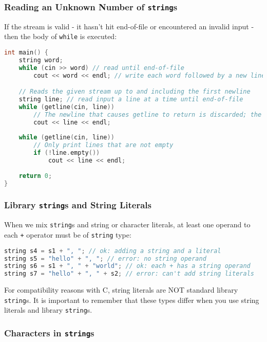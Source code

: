 \subsubsection{Reading an Unknown Number of \texttt{string}s}

If the stream is valid - it hasn't hit end-of-file or encountered an invalid input - then the body of \texttt{while} is executed:
\begin{lstlisting}[language=C++]
int main() { 
    string word; 
    while (cin >> word) // read until end-of-file 
        cout << word << endl; // write each word followed by a new line 

    // Reads the given stream up to and including the first newline
    string line; // read input a line at a time until end-of-file 
    while (getline(cin, line)) 
        // The newline that causes getline to return is discarded; the newline is not stored in the string.
        cout << line << endl; 
    
    while (getline(cin, line)) 
        // Only print lines that are not empty
        if (!line.empty()) 
            cout << line << endl;
    
    return 0; 
}
\end{lstlisting}

\subsubsection{Library \texttt{string}s and String Literals}

When we mix \texttt{string}s and string or character literals, at least one operand to each \texttt{+} operator must be of \texttt{string} type:
\begin{lstlisting}[language=C++]
string s4 = s1 + ", "; // ok: adding a string and a literal 
string s5 = "hello" + ", "; // error: no string operand 
string s6 = s1 + ", " + "world"; // ok: each + has a string operand 
string s7 = "hello" + ", " + s2; // error: can't add string literals
\end{lstlisting}
For compatibility reasons with C, string literals are NOT standard library \texttt{string}s. It is important to remember that these types differ when you use string literals and library \texttt{string}s.

\subsubsection{Characters in \texttt{string}s}

